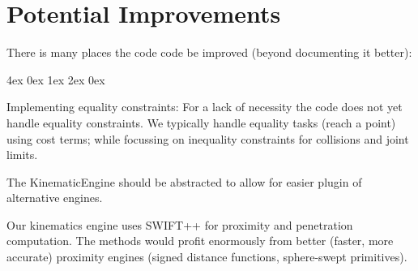 \documentclass[10pt,fleqn,twoside]{article}
\newenvironment{items}{
\par\small
\begin{list}{--}{\leftmargin4ex \rightmargin0ex \labelsep1ex \labelwidth2ex
\topsep0pt \parsep0ex \itemsep3pt}
}{
\end{list}
}
\begin{document}










\section{Potential Improvements}

There is many places the code code be improved (beyond documenting it
better):
\begin{items}
\item Implementing equality constraints: For a lack of necessity the
code does not yet handle equality constraints. We typically handle
equality tasks (reach a point) using cost terms; while focussing on
inequality constraints for collisions and joint limits.

\item The KinematicEngine should be abstracted to allow for easier
plugin of alternative engines.

\item Our kinematics engine uses SWIFT++ for proximity and penetration
computation. The methods would profit enormously from better (faster,
more accurate) proximity engines (signed distance functions, sphere-swept
primitives).
\end{items}
\end{document}
